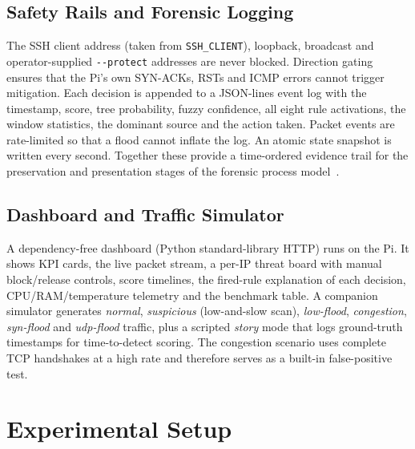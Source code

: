 \documentclass[conference]{IEEEtran}
\begin{document}
\subsection{Safety Rails and Forensic Logging}
The SSH client address (taken from \texttt{SSH\_CLIENT}), loopback, broadcast and operator-supplied \texttt{-{}-protect} addresses are never blocked. Direction gating ensures that the Pi's own SYN-ACKs, RSTs and ICMP errors cannot trigger mitigation. Each decision is appended to a JSON-lines event log with the timestamp, score, tree probability, fuzzy confidence, all eight rule activations, the window statistics, the dominant source and the action taken. Packet events are rate-limited so that a flood cannot inflate the log. An atomic state snapshot is written every second. Together these provide a time-ordered evidence trail for the preservation and presentation stages of the forensic process model~\cite{naing2023,ye2022}.

\subsection{Dashboard and Traffic Simulator}
A dependency-free dashboard (Python standard-library HTTP) runs on the Pi. It shows KPI cards, the live packet stream, a per-IP threat board with manual block/release controls, score timelines, the fired-rule explanation of each decision, CPU/RAM/temperature telemetry and the benchmark table. A companion simulator generates \emph{normal}, \emph{suspicious} (low-and-slow scan), \emph{low-flood}, \emph{congestion}, \emph{syn-flood} and \emph{udp-flood} traffic, plus a scripted \emph{story} mode that logs ground-truth timestamps for time-to-detect scoring. The congestion scenario uses complete TCP handshakes at a high rate and therefore serves as a built-in false-positive test.

\section{Experimental Setup}
\label{sec:setup}
\end{document}
